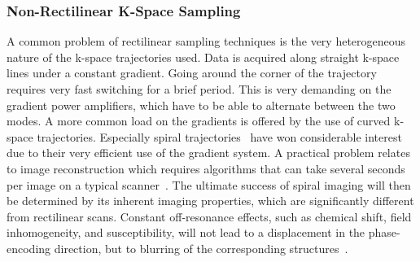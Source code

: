 \subsubsection{Non-Rectilinear K-Space Sampling}
A common problem of rectilinear sampling techniques is the very heterogeneous nature of the k-space trajectories used. Data is acquired along straight k-space lines under a constant gradient. Going around the corner of the trajectory requires very fast switching for a brief period. 
This 
is very demanding on the gradient power amplifiers, which have to be able to alternate between the two modes. A more common load on the gradients is offered by the use of curved k-space trajectories. Especially spiral trajectories~\cite{SpiralMRI, SpiralMRI2} have won considerable interest due to their very efficient use of the gradient system. 
A practical problem relates to image reconstruction which requires algorithms that can take several seconds per image on a typical scanner~\cite{SamplingStrategies}. 
The ultimate success of spiral imaging will then be determined by its inherent imaging properties, which are significantly different from rectilinear scans. Constant off-resonance effects, such as chemical shift, field inhomogeneity, and susceptibility, will not lead to a displacement in the phase-encoding direction, but to blurring of the corresponding structures~\cite{SamplingStrategies}.
